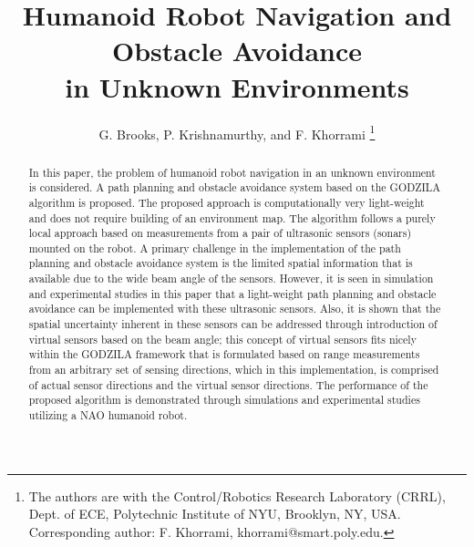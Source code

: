 \documentclass[10pt,conference]{ieeeconf}
\begin{document}
\title{\LARGE\bf Humanoid Robot Navigation and Obstacle Avoidance \\ in
Unknown Environments \\[-0.1ex]}
\author{G. Brooks, P. Krishnamurthy, and F. Khorrami%
\thanks{The authors are with the Control/Robotics Research Laboratory
  (CRRL), Dept. of ECE,
Polytechnic Institute of NYU, Brooklyn, NY, USA.  Corresponding author: F. Khorrami, khorrami@smart.poly.edu.}}

  \maketitle
\thispagestyle{empty}
\pagestyle{empty}




\begin{abstract}
In this paper, the problem of humanoid robot navigation in an unknown environment is considered. A path planning and obstacle avoidance system based on the GODZILA algorithm is proposed. The proposed approach is computationally very light-weight and does not require building of an environment map. The algorithm follows a purely local approach based on measurements from a pair of ultrasonic sensors (sonars) mounted on the robot. A primary challenge in the implementation of the path planning and obstacle avoidance system is the limited spatial information that is available due to the wide beam angle of the sensors. However, it is seen in simulation and experimental studies in this paper that a light-weight path planning and obstacle avoidance can be implemented with these ultrasonic sensors. Also, it is shown that the spatial uncertainty inherent in these sensors can be addressed through introduction of virtual sensors based on the beam angle; this concept of virtual sensors fits nicely within the GODZILA framework that is formulated based on range measurements from an arbitrary set of sensing directions, which in this implementation, is comprised of actual sensor directions and the virtual sensor directions. The performance of the proposed algorithm is demonstrated through simulations and experimental studies utilizing a NAO humanoid robot.
\end{abstract}




    \vspace*{-0.1in}
\end{document}
